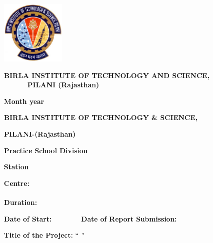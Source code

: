 \documentclass[letterpaper]{article}
\begin{document}
\bigskip

{\centering 
\includegraphics[width=3.175cm,height=3.124cm]{formatreport-img2.jpg}
\par}


\bigskip


\bigskip

{\centering{}\bfseries
BIRLA INSTITUTE OF TECHNOLOGY AND SCIENCE, \ \ \ \ \ \ PILANI
(Rajasthan)
\par}

{\centering{}\bfseries
Month year
\par}


\bigskip


\bigskip


\bigskip


\bigskip

{\centering{}\bfseries
BIRLA INSTITUTE OF TECHNOLOGY \& SCIENCE,
\par}

{\centering{}\bfseries
PILANI-(Rajasthan)
\par}


\bigskip

{\centering{}\bfseries
Practice School Division
\par}


\bigskip


\bigskip

{\bfseries
Station }

{
\textbf{Centre:
\ \ \ \ \ }\ \ \ \ \ \ \ \ \ \ \ \ \ \ \ \ \ \ \ \ \ \ \ \ \ \ \ \ \ \ \ \ \ \ \ \ \ \ \ \ \ \ \ \ \ \ \ \ \ \ \ \ \ \ \ \ \ \ \ \ \ \ \ \ \ \textbf{Duration:
}\ }

{
\textbf{Date of Start}\textbf{:} \ \ \ \  \ \ \ \ \textbf{Date of Report
Submission:}}


\bigskip


\bigskip

{
\textbf{Title of the Project:
}{\textquotedblleft}\textbf{\textcolor{black}{
}}\textcolor{black}{{\textquotedblright}}}
\end{document}
